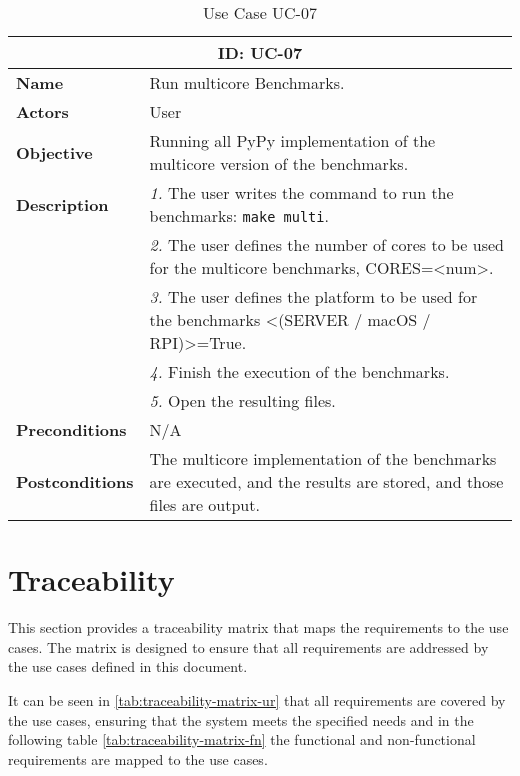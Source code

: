 \begin{table}[H]
    \centering
    \begin{tabular}{l p{10cm}}
        \toprule
        \multicolumn{2}{c}{\textbf{ID: UC-07}} \\
        \toprule
        \textbf{Name}                         &  Run multicore Benchmarks. \\
        \textbf{Actors}                       &  User \\
        \textbf{Objective}                    &  Running all PyPy implementation of the multicore version of the benchmarks. \\
        \multirow{1}{*}{\textbf{Description}} & \textsl{1.} The user writes the command to run the benchmarks: \texttt{make multi}.\\
                                              & \textsl{2.} The user defines the number of cores to be used for the multicore benchmarks, CORES=<num>.\\
                                              & \textsl{3.} The user defines the platform to be used for the benchmarks <(SERVER / macOS / RPI)>=True.\\
                                              & \textsl{4.} Finish the execution of the benchmarks.\\
                                              & \textsl{5.} Open the resulting files.\\
        \textbf{Preconditions}                &  N/A \\
        \textbf{Postconditions}               &  The multicore implementation of the benchmarks are executed, and the results are stored, and those files are output. \\
    \end{tabular}
    \caption{Use Case UC-07}
    \label{tab:uc-07}
\end{table}



\section{Traceability}

This section provides a traceability matrix that maps the requirements to the use cases. The matrix is designed to ensure that all requirements are addressed by the use cases defined in this document.

It can be seen in \autoref{tab:traceability-matrix-ur} that all requirements are covered by the use cases, ensuring that the system meets the specified needs and in the following table \autoref{tab:traceability-matrix-fn} the functional and non-functional requirements are mapped to the use cases.

